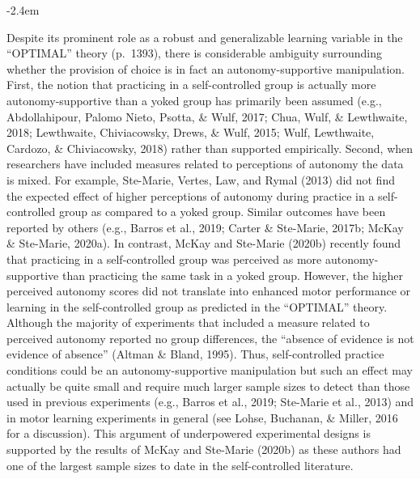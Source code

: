 \documentclass[final]{article}
\renewenvironment{quote}{\begin{fquote}\advance\leftmargini -2.4em\begin{oldquote}}{\end{oldquote}\end{fquote}}
\newenvironment{fquote}
  {\def\FrameCommand{
	\fboxsep=0.6em %
	\fcolorbox{black}{white}}%
    \MakeFramed {\advance\hsize-2\width \FrameRestore}
    \begin{minipage}{\linewidth}
  }
  {\end{minipage}\endMakeFramed}
\begin{document}
\begin{quote}
Despite its prominent role as a robust and generalizable learning variable in the ``OPTIMAL'' theory (p.~1393), there is considerable ambiguity surrounding whether the provision of choice is in fact an autonomy-supportive manipulation. First, the notion that practicing in a self-controlled group is actually more autonomy-supportive than a yoked group has primarily been assumed (e.g., Abdollahipour, Palomo Nieto, Psotta, \& Wulf, 2017; Chua, Wulf, \& Lewthwaite, 2018; Lewthwaite, Chiviacowsky, Drews, \& Wulf, 2015; Wulf, Lewthwaite, Cardozo, \& Chiviacowsky, 2018) rather than supported empirically. Second, when researchers have included measures related to perceptions of autonomy the data is mixed. For example, Ste-Marie, Vertes, Law, and Rymal (2013) did not find the expected effect of higher perceptions of autonomy during practice in a self-controlled group as compared to a yoked group. Similar outcomes have been reported by others (e.g., Barros et al., 2019; Carter \& Ste-Marie, 2017b; McKay \& Ste-Marie, 2020a). In contrast, McKay and Ste-Marie (2020b) recently found that practicing in a self-controlled group was perceived as more autonomy-supportive than practicing the same task in a yoked group. However, the higher perceived autonomy scores did not translate into enhanced motor performance or learning in the self-controlled group as predicted in the ``OPTIMAL'' theory. Although the majority of experiments that included a measure related to perceived autonomy reported no group differences, the ``absence of evidence is not evidence of absence'' (Altman \& Bland, 1995). Thus, self-controlled practice conditions could be an autonomy-supportive manipulation but such an effect may actually be quite small and require much larger sample sizes to detect than those used in previous experiments (e.g., Barros et al., 2019; Ste-Marie et al., 2013) and in motor learning experiments in general (see Lohse, Buchanan, \& Miller, 2016 for a discussion). This argument of underpowered experimental designs is supported by the results of McKay and Ste-Marie (2020b) as these authors had one of the largest sample sizes to date in the self-controlled literature.
\end{quote}

\end{document}
